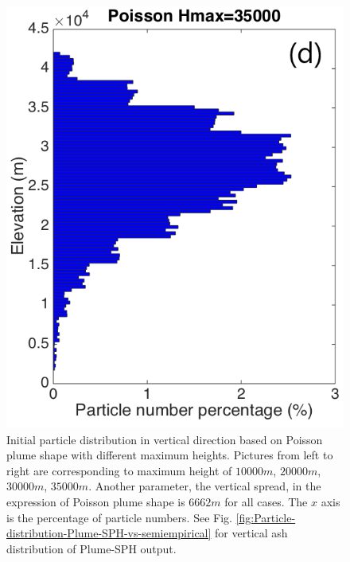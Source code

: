 \documentclass[draft,linenumbers]{agujournal2019}
\begin{document}
\begin{figure}[!htb]
\begin{minipage}{.247 \textwidth}
\end{minipage}%
\begin{minipage}{.247 \textwidth}
\centering
\includegraphics[width=0.99 \textwidth]{Figures/Possion-Hmax35k-ParticleDis-z}
\end{minipage}%
\caption{Initial particle distribution in vertical direction based on Poisson plume shape with different maximum heights. Pictures from left to right are corresponding to maximum height of $10000 m$, $20000 m$, $30000 m$, $35000 m$. Another parameter, the vertical spread, in the expression of Poisson plume shape is $6662 m$ for all cases. The $x$ axis is the percentage of particle numbers. See Fig. \ref{fig:Particle-distribution-Plume-SPH-vs-semiempirical} for vertical ash distribution of Plume-SPH output.}
\label{fig:Particle-distribution-Plume-calibrate-semiempirical}
\end{figure}
\end{document}
